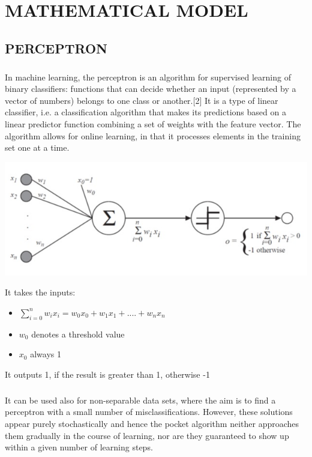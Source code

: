 \documentclass[11pt,a4paper,twoside]{report}
\begin{document}
\chapter{MATHEMATICAL MODEL}

\section{PERCEPTRON}
\paragraph{ }In machine learning, the perceptron is an algorithm for supervised learning of binary classifiers: functions that can decide whether an input (represented by a vector of numbers) belongs to one class or another.[2] It is a type of linear classifier, i.e. a classification algorithm that makes its predictions based on a linear predictor function combining a set of weights with the feature vector. The algorithm allows for online learning, in that it processes elements in the training set one at a time.\\
\begin{center}
\includegraphics[scale=.75]{per.jpg}
\end{center}
It takes the inputs:
\begin{itemize}
\item $\sum_{i=0}^{n}w_ix_i =w_0x_0+w_1x_1+....+w_nx_n  $
\item $w_0$ denotes a threshold value
\item $x_0$ always 1
\end{itemize}
It outputs 1, if the result is greater than 1, otherwise -1
\paragraph{ }It can be used also for non-separable data sets, where the aim is to find a perceptron with a small number of misclassifications. However, these solutions appear purely stochastically and hence the pocket algorithm neither approaches them gradually in the course of learning, nor are they guaranteed to show up within a given number of learning steps.
\end{document}
